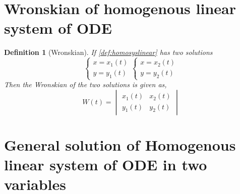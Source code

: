 \documentclass[oneside,11pt,pdftex,final]{book}%
\numberwithin{equation}{section}
\newtheorem{definition}[theorem]{Definition}
\numberwithin{section}{chapter}
\numberwithin{equation}{chapter}
\begin{document}
\section{Wronskian of homogenous linear system of ODE}
\begin{definition}[Wronskian] If \ref{def:homosyslinear} has two solutions \[ \begin{cases}
		x=x_1(t)\\
		y=y_1(t)
	\end{cases} \begin{cases}
	x=x_2(t)\\
	y=y_2(t)
\end{cases}\]
Then the Wronskian of the two solutions is given as,
	\[ W(t)=\begin{vmatrix}
		x_1(t) & x_2(t)\\
		y_1(t) & y_2(t)
	\end{vmatrix} \]
\end{definition}


\section{General solution of Homogenous linear system of ODE in two variables}
\end{document}
